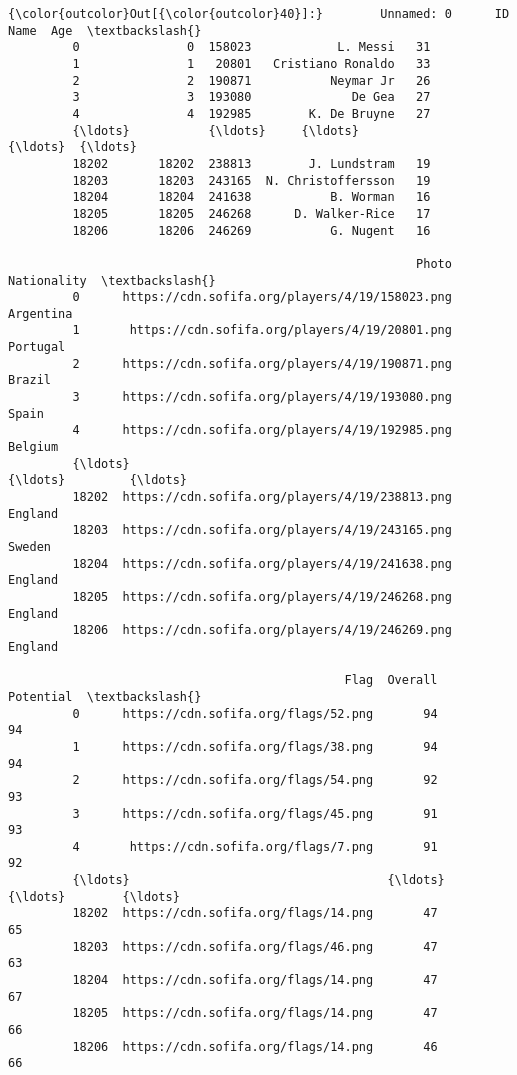 \documentclass[11pt]{article}
\begin{document}
\begin{Verbatim}[commandchars=\\\{\}]
{\color{outcolor}Out[{\color{outcolor}40}]:}        Unnamed: 0      ID                Name  Age  \textbackslash{}
         0               0  158023            L. Messi   31   
         1               1   20801   Cristiano Ronaldo   33   
         2               2  190871           Neymar Jr   26   
         3               3  193080              De Gea   27   
         4               4  192985        K. De Bruyne   27   
         {\ldots}           {\ldots}     {\ldots}                 {\ldots}  {\ldots}   
         18202       18202  238813        J. Lundstram   19   
         18203       18203  243165  N. Christoffersson   19   
         18204       18204  241638           B. Worman   16   
         18205       18205  246268      D. Walker-Rice   17   
         18206       18206  246269           G. Nugent   16   
         
                                                         Photo Nationality  \textbackslash{}
         0      https://cdn.sofifa.org/players/4/19/158023.png   Argentina   
         1       https://cdn.sofifa.org/players/4/19/20801.png    Portugal   
         2      https://cdn.sofifa.org/players/4/19/190871.png      Brazil   
         3      https://cdn.sofifa.org/players/4/19/193080.png       Spain   
         4      https://cdn.sofifa.org/players/4/19/192985.png     Belgium   
         {\ldots}                                               {\ldots}         {\ldots}   
         18202  https://cdn.sofifa.org/players/4/19/238813.png     England   
         18203  https://cdn.sofifa.org/players/4/19/243165.png      Sweden   
         18204  https://cdn.sofifa.org/players/4/19/241638.png     England   
         18205  https://cdn.sofifa.org/players/4/19/246268.png     England   
         18206  https://cdn.sofifa.org/players/4/19/246269.png     England   
         
                                               Flag  Overall  Potential  \textbackslash{}
         0      https://cdn.sofifa.org/flags/52.png       94         94   
         1      https://cdn.sofifa.org/flags/38.png       94         94   
         2      https://cdn.sofifa.org/flags/54.png       92         93   
         3      https://cdn.sofifa.org/flags/45.png       91         93   
         4       https://cdn.sofifa.org/flags/7.png       91         92   
         {\ldots}                                    {\ldots}      {\ldots}        {\ldots}   
         18202  https://cdn.sofifa.org/flags/14.png       47         65   
         18203  https://cdn.sofifa.org/flags/46.png       47         63   
         18204  https://cdn.sofifa.org/flags/14.png       47         67   
         18205  https://cdn.sofifa.org/flags/14.png       47         66   
         18206  https://cdn.sofifa.org/flags/14.png       46         66   
         

\end{Verbatim}
\end{document}
